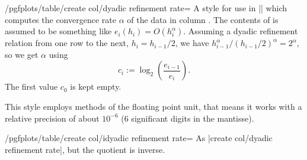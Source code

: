 \begin{stylekey}{/pgfplots/table/create col/dyadic refinement rate=}
	A style for use in |\pgfplotstablecreatecol| which computes the convergence rate $\alpha$ of the data in column . The contents of  is assumed to be something like $e_i(h_i) = O(h_i^\alpha)$. Assuming a dyadic refinement relation from one row to the next, $h_i = h_{i-1}/2$, we have $h_{i-1}^\alpha / (h_{i-1}/2)^\alpha = 2^\alpha$, so we get $\alpha$ using 
	\[ c_i := \log_2\left( \frac{e_{i-1}}{e_i} \right). \]
	The first value $c_0$ is kept empty.

\begin{codeexample}[]
\end{codeexample}
	This style employs methods of the floating point unit, that means it works with a relative precision of about $10^{-6}$ ($6$ significant digits in the mantisse).
\end{stylekey}

\begin{stylekey}{/pgfplots/table/create col/idyadic refinement rate=}
	As |create col/dyadic refinement rate|, but the quotient is inverse.
\end{stylekey}

